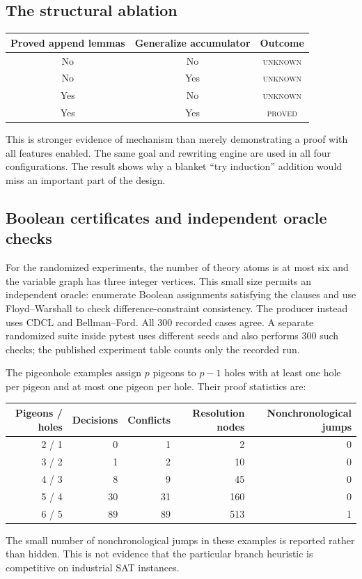 \documentclass[11pt,letterpaper]{article}
\newcommand{\Unknown}{\textsc{unknown}}
\newcommand{\Proved}{\textsc{proved}}
\theoremstyle{definition}\newtheorem{definition}[theorem]{Definition}
\theoremstyle{remark}\newtheorem{remark}[theorem]{Remark}
\begin{document}
\subsection{The structural ablation}
\begin{center}
\begin{tabular}{ccc}
\toprule
Proved append lemmas & Generalize accumulator & Outcome \\
\midrule
No & No & \Unknown \\
No & Yes & \Unknown \\
Yes & No & \Unknown \\
Yes & Yes & \Proved \\
\bottomrule
\end{tabular}
\end{center}
This is stronger evidence of mechanism than merely demonstrating a proof with all features enabled. The same goal and rewriting engine are used in all four configurations. The result shows why a blanket ``try induction'' addition would miss an important part of the design.

\subsection{Boolean certificates and independent oracle checks}
For the randomized experiments, the number of theory atoms is at most six and the variable graph has three integer vertices. This small size permits an independent oracle: enumerate Boolean assignments satisfying the clauses and use Floyd--Warshall to check difference-constraint consistency. The producer instead uses CDCL and Bellman--Ford. All 300 recorded cases agree. A separate randomized suite inside pytest uses different seeds and also performs 300 such checks; the published experiment table counts only the recorded run.

The pigeonhole examples assign $p$ pigeons to $p-1$ holes with at least one hole per pigeon and at most one pigeon per hole. Their proof statistics are:
\begin{center}
\begin{tabular}{rrrrr}
\toprule
Pigeons / holes & Decisions & Conflicts & Resolution nodes & Nonchronological jumps \\
\midrule
2 / 1 & 0 & 1 & 2 & 0 \\
3 / 2 & 1 & 2 & 10 & 0 \\
4 / 3 & 8 & 9 & 45 & 0 \\
5 / 4 & 30 & 31 & 160 & 0 \\
6 / 5 & 89 & 89 & 513 & 1 \\
\bottomrule
\end{tabular}
\end{center}
The small number of nonchronological jumps in these examples is reported rather than hidden. This is not evidence that the particular branch heuristic is competitive on industrial SAT instances.
\end{document}
